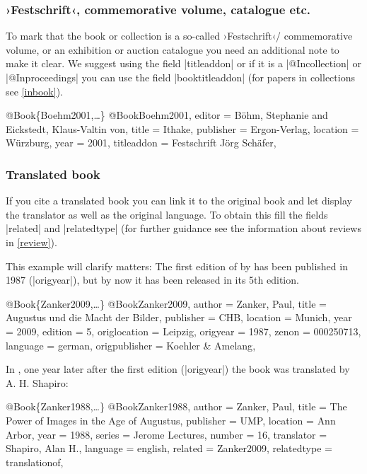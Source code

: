 \documentclass[a4paper,
10pt,
greek,
french,
spanish,
italian,
ngerman,
english,
]{ltxdoc}
\begin{document}
\subsubsection{›Festschrift‹, commemorative volume, catalogue etc.}
To mark that the book or collection is a so-called ›Festschrift‹/ commemorative volume, 
or an exhibition or auction catalogue you need an additional note to make it clear.
We suggest using  the field |titleaddon| or if it is a |@Incollection| or |@Inproceedings| you can use the field |booktitleaddon| (for papers in collections see \cref{inbook}).
\begin{bibexample}[label=Boehm2001]{{@}Book\{Boehm2001,…\}}
@Book{Boehm2001,
  editor     = {Böhm, Stephanie and Eickstedt, Klaus-Valtin von},
  title      = {Ithake},
  publisher  = {Ergon-Verlag},
  location   = {Würzburg},
  year       = {2001},
  titleaddon = {Festschrift Jörg Schäfer},
}
\end{bibexample}

 
\subsubsection{Translated book}
If you cite a translated book you can link it to the original book and let display the translator as well as the original language. 
To obtain this fill the fields |related| and |relatedtype| (for further guidance see the information about reviews in \cref{review}).

This example will clarify matters:
The first edition of  by \citeauthor*{Zanker2009} has been published in 1987 (|origyear|), but by now it has been released in its 5th edition.

\begin{bibexample}[label=Zanker2009]{{@}Book\{Zanker2009,…\}}
@Book{Zanker2009,
  author        = {Zanker, Paul},
  title         = {Augustus und die Macht der Bilder},
  publisher     = CHB,   %
  location      = Munich,  %
  year          = {2009},
  edition       = {5},
  origlocation  = Leipzig, %
  origyear      = {1987},
  zenon        = {000250713},
  language      = {german},
  origpublisher = {Koehler \& Amelang},
}
\end{bibexample}

In \citeyear{Zanker1988}, one year later after the first edition (|origyear|) the book was translated by A. H. Shapiro:
\begin{bibexample}[label=Zanker1988]{{@}Book\{Zanker1988,…\}}
@Book{Zanker1988,
  author      = {Zanker, Paul},
  title       = {The Power of Images in the Age of Augustus},
  publisher   = UMP,    %
  location    = {Ann Arbor},
  year        = {1988},
  series      = {Jerome Lectures},
  number      = {16},
  translator  = {Shapiro, Alan H.},
  language    = {english},
  related     = {Zanker2009},
  relatedtype = {translationof},
}
\end{bibexample}
\end{document}
